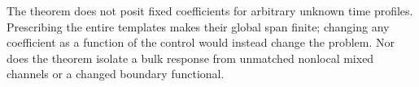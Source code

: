 The theorem does not posit fixed coefficients for arbitrary unknown time profiles. Prescribing the entire templates makes their global span finite; changing any coefficient as a function of the control would instead change the problem. Nor does the theorem isolate a bulk response from unmatched nonlocal mixed channels or a changed boundary functional.
